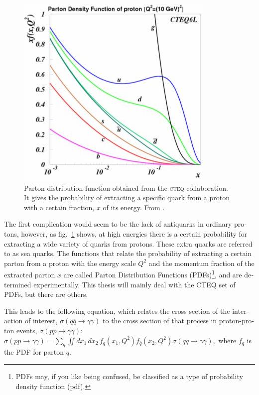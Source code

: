 \begin{english}
\begin{figure}[hbt]
\includegraphics[width=.55\textwidth]{pdf}\hfill\parbox[b]{.44\textwidth}{
\caption{Parton distribution function obtained from the \textsc{cteq} collaboration. It gives the probability of extracting a specific quark from a proton with a certain fraction, $x$ of its energy. From \cite{scien2}.\label{pdff}}}
\end{figure}

The first complication would seem to be the lack of antiquarks in ordinary protons, however, as fig.~\ref{pdff} shows, at high energies there is a certain probability for extracting a wide variety of quarks from protons. These extra quarks are referred to as sea quarks. The functions that relate the probability of extracting a certain parton from a proton with the energy scale $Q^2$ and the momentum fraction of the extracted parton $x$ are called Parton Distribution Functions (PDFs)\footnote{PDFs may, if you like being confused, be classified as a type of probability density function (pdf).}, and are determined experimentally. This thesis will mainly deal with the CTEQ set of PDFs, but there are others.

This leads to the following equation, which relates the cross section of the interaction of interest, $\sigma(q\overline{q}\rightarrow\gamma\gamma)$ to the cross section of that process in proton-proton events, $\sigma(pp\rightarrow\gamma\gamma)$:
\(\sigma(pp\rightarrow\gamma\gamma)=\sum_q\iint dx_1\,dx_2\,f_q(x_1,Q^2)f_{\bar q}(x_2,Q^2)\sigma(q\bar q\rightarrow\gamma\gamma),\label{pdf}\)
where $f_q$ is the PDF for parton $q$.



\end{english}
